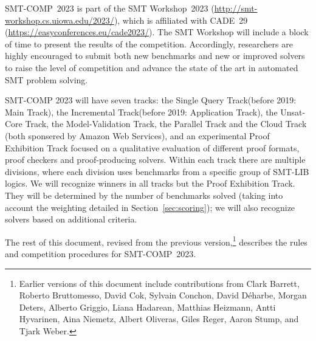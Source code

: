\documentclass[12pt]{article}
\newcommand{\maintrack}{Single Query Track\xspace}
\newcommand{\inctrack}{Incremental Track\xspace}
\newcommand{\ucoretrack}{Unsat-Core Track\xspace}
\newcommand{\mvaltrack}{Model-Validation Track\xspace}
\newcommand{\paralleltrack}{Parallel Track\xspace}
\newcommand{\cloudtrack}{Cloud Track\xspace}
\newcommand{\prooftrack}{Proof Exhibition Track\xspace}
\begin{document}
SMT-COMP~2023 is part of the SMT Workshop~2023
(\url{http://smt-workshop.cs.uiowa.edu/2023/}),
which is affiliated with CADE~29 (\url{https://easyconferences.eu/cade2023/}).
The SMT Workshop will include a block of time to present the results of the
competition.
%
Accordingly, researchers are highly encouraged to submit both new
benchmarks and new or improved solvers to raise the level of
competition and advance the state of the art in automated SMT problem
solving.

SMT-COMP 2023 will have seven tracks: the \maintrack (before 2019: Main Track),
the \inctrack (before 2019: Application Track), the \ucoretrack, the \mvaltrack,
the \paralleltrack{} and the \cloudtrack{} (both sponsered by Amazon Web
Services), and an experimental \prooftrack{} focused on a qualitative evaluation
of different proof formats, proof checkers and proof-producing solvers.
%
Within each track there are multiple divisions, where each division
uses benchmarks from a specific group of SMT-LIB logics.
%
We will recognize winners in all tracks but the \prooftrack{}.
%
They will be determined by the number of benchmarks solved (taking into account
the weighting detailed in Section~\ref{sec:scoring}); we will also recognize
solvers based on additional criteria.

The rest of this document, revised from the previous
version,\footnote{Earlier versions of this document include
  contributions from Clark Barrett, Roberto Bruttomesso, David Cok,
  Sylvain Conchon, David D{\'e}harbe, Morgan Deters, Alberto Griggio,
  Liana Hadarean,
  Matthias Heizmann, Antti Hyvarinen, Aina Niemetz, Albert Oliveras, Giles Reger, Aaron Stump,
  and Tjark Weber.}  describes the rules and competition procedures for
SMT-COMP~2023.
%
\end{document}
